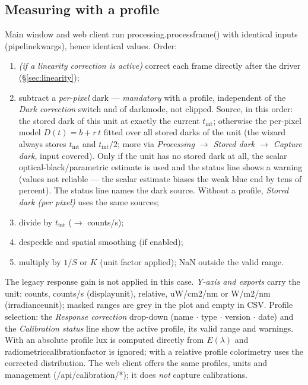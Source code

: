 \documentclass[12pt,a4paper]{article}
\DeclareRobustCommand{\code}[1]{{\ttfamily\small\def\_{\rawus\allowbreak}#1}}
\DeclareRobustCommand{\key}[1]{{\ttfamily\small\color{acc2}\def\_{\rawus\allowbreak}#1}}
\begin{document}
\subsection{Measuring with a profile}\label{sec:speccal-apply}
Main window and web client run \code{processing.process\_frame()} with identical
inputs (\code{pipeline\_kwargs}), hence identical values. Order:
\begin{enumerate}
  \item \emph{(if a linearity correction is active)} correct each frame directly after
        the driver (\S\ref{sec:linearity});
  \item subtract a \emph{per-pixel} dark --- \emph{mandatory} with a profile,
        independent of the \emph{Dark correction} switch and of \key{dark\_mode},
        not clipped. Source, in this order: the stored dark of this unit at
        exactly the current $t_{\mathrm{int}}$; otherwise the per-pixel model
        $D(t) = b + r\,t$ fitted over all stored darks of the unit (the wizard
        always stores $t_{\mathrm{int}}$ and $t_{\mathrm{int}}/2$; more via
        \emph{Processing $\to$ Stored dark $\to$ Capture dark}, input covered).
        Only if the unit has no stored dark at all, the scalar
        optical-black/parametric estimate is used and the status line shows a
        warning (values not reliable --- the scalar estimate biases the weak
        blue end by tens of percent). The status line names the dark source.
        Without a profile, \emph{Stored dark (per pixel)} uses the same sources;
  \item divide by $t_{\mathrm{int}}$ ($\to$ counts/s);
  \item despeckle and spatial smoothing (if enabled);
  \item multiply by $1/S$ or $K$ (unit factor applied); NaN outside the valid range.
\end{enumerate}
The legacy response gain is not applied in this case. \emph{Y-axis and exports}
carry the unit: counts, counts/s (\key{display\_unit}), relative,
\code{uW/cm2/nm} or \code{W/m2/nm} (\key{irradiance\_unit}); masked ranges are
grey in the plot and empty in CSV. Profile selection: the \emph{Response
correction} drop-down (name $\cdot$ type $\cdot$ version $\cdot$ date) and the
\emph{Calibration status} line show the active profile, its valid range and
warnings. With an absolute profile lux is computed directly from $E(\lambda)$
and \key{radiometric\_calibration\_factor} is ignored; with a relative profile
colorimetry uses the corrected distribution. The web client offers the same
profiles, units and management (\code{/api/calibration/*}); it does
\emph{not} capture calibrations.
\end{document}
